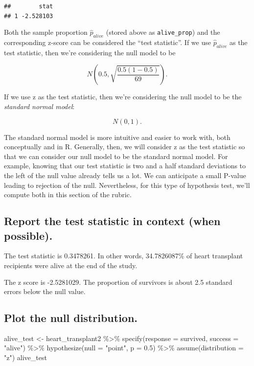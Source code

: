 \documentclass[
]{book}
\newenvironment{Shaded}{\begin{snugshade}}{\end{snugshade}}
\newcommand{\AttributeTok}[1]{\textcolor[rgb]{0.77,0.63,0.00}{#1}}
\newcommand{\FloatTok}[1]{\textcolor[rgb]{0.00,0.00,0.81}{#1}}
\newcommand{\FunctionTok}[1]{\textcolor[rgb]{0.00,0.00,0.00}{#1}}
\newcommand{\NormalTok}[1]{#1}
\newcommand{\OtherTok}[1]{\textcolor[rgb]{0.56,0.35,0.01}{#1}}
\newcommand{\SpecialCharTok}[1]{\textcolor[rgb]{0.00,0.00,0.00}{#1}}
\newcommand{\StringTok}[1]{\textcolor[rgb]{0.31,0.60,0.02}{#1}}
\begin{document}
\begin{verbatim}
##        stat
## 1 -2.528103
\end{verbatim}

Both the sample proportion \(\hat{p}_{alive}\) (stored above as \texttt{alive\_prop}) and the corresponding z-score can be considered the ``test statistic''. If we use \(\hat{p}_{alive}\) as the test statistic, then we're considering the null model to be

\[
N\left(0.5, \sqrt{\frac{0.5 (1 - 0.5)}{69}}\right).
\]

If we use z as the test statistic, then we're considering the null model to be the \emph{standard normal model}:

\[
N(0, 1).
\]

The standard normal model is more intuitive and easier to work with, both conceptually and in R. Generally, then, we will consider z as the test statistic so that we can consider our null model to be the standard normal model. For example, knowing that our test statistic is two and a half standard deviations to the left of the null value already tells us a lot. We can anticipate a small P-value leading to rejection of the null. Nevertheless, for this type of hypothesis test, we'll compute both in this section of the rubric.

\hypertarget{one-prop-ex-report-test-stat}{%
\subsection{Report the test statistic in context (when possible).}\label{one-prop-ex-report-test-stat}}

The test statistic is 0.3478261. In other words, 34.7826087\% of heart transplant recipients were alive at the end of the study.

The z score is -2.5281029. The proportion of survivors is about 2.5 standard errors below the null value.

\hypertarget{one-prop-ex-plot_null}{%
\subsection{Plot the null distribution.}\label{one-prop-ex-plot_null}}

\begin{Shaded}
\begin{Highlighting}[]
\NormalTok{alive\_test }\OtherTok{\textless{}{-}}\NormalTok{ heart\_transplant2 }\SpecialCharTok{\%\textgreater{}\%}
    \FunctionTok{specify}\NormalTok{(}\AttributeTok{response =}\NormalTok{ survived, }\AttributeTok{success =} \StringTok{"alive"}\NormalTok{) }\SpecialCharTok{\%\textgreater{}\%}
    \FunctionTok{hypothesize}\NormalTok{(}\AttributeTok{null =} \StringTok{"point"}\NormalTok{, }\AttributeTok{p =} \FloatTok{0.5}\NormalTok{) }\SpecialCharTok{\%\textgreater{}\%}
    \FunctionTok{assume}\NormalTok{(}\AttributeTok{distribution =} \StringTok{"z"}\NormalTok{)}
\NormalTok{alive\_test}
\end{Highlighting}
\end{Shaded}
\end{document}
